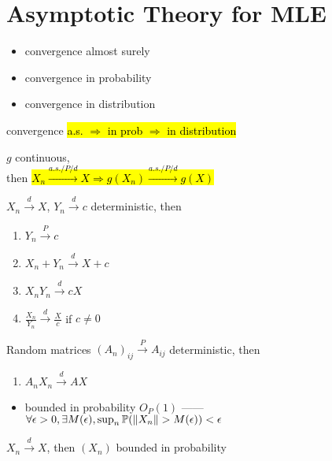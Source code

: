 \section{Asymptotic Theory for MLE}\label{sec:asymptotic-theory-for-mle}

\begin{itemize}
    \item convergence almost surely
    \item convergence in probability
    \item convergence in distribution
\end{itemize}

\begin{prop}
    convergence \hl{a.s. $\Rightarrow$ in prob $\Rightarrow$ in distribution}
\end{prop}

\begin{prop}
    $g$ continuous,\\ then \hl{$X_n \xrightarrow{a.s./P/d} X \Rightarrow g(X_n) \xrightarrow{a.s./P/d} g(X)$}
\end{prop}

\begin{prop}
    $X_n \xrightarrow{d} X$, $Y_n \xrightarrow{d} c$ deterministic, then
    \begin{enumerate}
        \item $Y_n \xrightarrow{P} c$
        \item $X_n + Y_n \xrightarrow{d} X + c$
        \item $X_{n}Y_n \xrightarrow{d} cX$
        \item $\frac{X_n}{Y_n} \xrightarrow{d} \frac{X}{c}$ if $c \neq 0$
    \end{enumerate}
    Random matrices $(A_n)_{ij} \xrightarrow{P} A_{ij}$ deterministic, then
    \begin{enumerate}
        \item $A_{n}X_n \xrightarrow{d} AX$
    \end{enumerate}
\end{prop}

\begin{itemize}
    \item bounded in probability $O_P(1)$ ------ $\forall \epsilon > 0, \exists M(\epsilon), \sup_n\mathbb{P}(\left\lVert X_n\right\rVert > M(\epsilon)) < \epsilon$
\end{itemize}

\begin{prop}
    $X_n \xrightarrow{d} X$, then $(X_n)$ bounded in probability
\end{prop}

